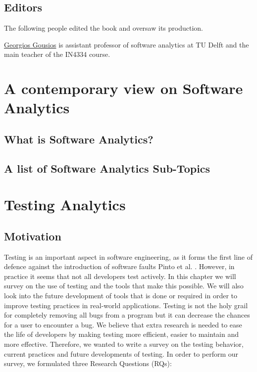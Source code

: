 \documentclass[]{book}
\begin{document}
\section*{Editors}\label{editors}

The following people edited the book and oversaw its production.

\href{http://gousios.org}{Georgios Gousios} is assistant professor of
software analytics at TU Delft and the main teacher of the IN4334
course.

\chapter{A contemporary view on Software
Analytics}\label{a-contemporary-view-on-software-analytics}

\section{What is Software Analytics?}\label{what-is-software-analytics}

\section{A list of Software Analytics
Sub-Topics}\label{a-list-of-software-analytics-sub-topics}

\chapter{Testing Analytics}\label{testing-analytics}

\section{Motivation}\label{motivation}

Testing is an important aspect in software engineering, as it forms the
first line of defence against the introduction of software faults Pinto
et al. \cite{pinto2012understanding}. However, in practice it seems that
not all developers test actively. In this chapter we will survey on the
use of testing and the tools that make this possible. We will also look
into the future development of tools that is done or required in order
to improve testing practices in real-world applications. Testing is not
the holy grail for completely removing all bugs from a program but it
can decrease the chances for a user to encounter a bug. We believe that
extra research is needed to ease the life of developers by making
testing more efficient, easier to maintain and more effective.
Therefore, we wanted to write a survey on the testing behavior, current
practices and future developments of testing. In order to perform our
survey, we formulated three Research Questions (RQs):
\end{document}
